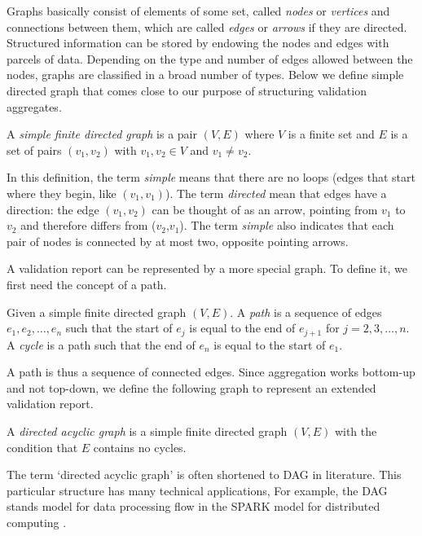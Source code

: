 Graphs basically consist of elements of some set, called \emph{nodes} or
\emph{vertices} and connections between them, which are called \emph{edges} or
\emph{arrows} if they are directed. Structured information can be stored by
endowing the nodes and edges with parcels of data.  Depending on the type and
number of edges allowed between the nodes, graphs are classified in a broad
number of types.  Below we define simple directed graph that comes close to our
purpose of structuring validation aggregates.
%
\begin{definition}
\label{def:simplegraph}
A \emph{simple finite directed graph} is a pair  $(V,E)$ where $V$ is a finite set and $E$
is a set of pairs $(v_1,v_2)$ with $v_1,v_2\in V$ and $v_1\not=v_2$.
\end{definition}
In this definition, the term \emph{simple} means that there are no loops (edges
that start where they begin, like $(v_1,v_1)$). The term \emph{directed} mean
that edges have a direction: the edge $(v_1,v_2)$ can be thought of as an
arrow, pointing from $v_1$ to $v_2$ and therefore differs from ($v_2$,$v_1$).
The term \emph{simple} also indicates that each pair of nodes is connected by
at most two, opposite pointing arrows.

A validation report can be represented by a more special graph. To define
it, we first need the concept of a path.
\begin{definition}
\label{def:pathcycle}
Given a simple finite directed graph $(V,E)$. A \emph{path} is a sequence of
edges $e_1,e_2,\ldots,e_n$ such that the start of $e_j$ is equal to the end of
$e_{j+1}$ for $j=2,3,\ldots,n$. A \emph{cycle} is a path such that the end of
$e_n$ is equal to the start of $e_1$.
\end{definition}
A path is thus a sequence of connected edges. Since aggregation works bottom-up
and not top-down, we define the following graph to represent an extended
validation report.
\begin{definition}
A \emph{directed acyclic graph} is a simple finite directed graph $(V,E)$ with
the condition that $E$ contains no cycles.
\end{definition}
%
The term `directed acyclic graph' is often shortened to DAG in literature. This
particular structure has many technical applications, For example, the DAG
stands model for data processing flow in the SPARK model for distributed
computing \citep{gupta2003spark}. 


